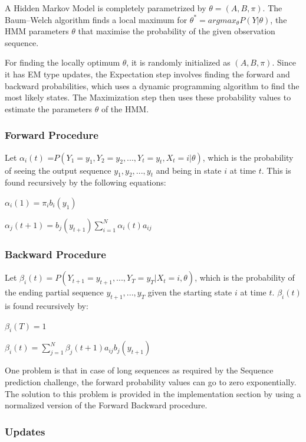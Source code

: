 \documentclass[letterpaper]{article}
\begin{document}
A Hidden Markov Model is completely parametrized by  $\theta = (A,B,\pi)$. The Baum–Welch algorithm finds a local maximum for $\theta^{*} = argmax_{\theta} P(Y|\theta)$, the HMM parameters $\theta$ that maximise the probability of the given observation sequence.
 
For finding the locally optimum $\theta$, it is randomly initialized as $(A, B, \pi)$. Since it has EM type updates, the Expectation step involves finding the forward and backward probabilities, which uses a dynamic programming algorithm to find the most likely states. The Maximization step then uses these probability values to estimate the parameters $\theta$ of the HMM.

\subsubsection{Forward Procedure}
Let $\alpha_{i}(t)$ =$P(Y_{1}=y_{1},Y_{2}=y_{2},...,Y_{t}=y_{t},X_{t}={i}|\theta)$, which is the probability of seeing the output sequence $y_{1},y_{2},...,y_{t}$ and being in state $i$ at time $t$. This is found recursively by the following equations:

\begin{center}
$\alpha_{i}(1)=\pi_{i} b_{i}(y_{1})$

$\alpha_{j}(t+1)=b_{j}(y_{t+1}) \sum_{i=1}^{N}\alpha_{i}(t) a_{ij}$
\end{center}

\subsubsection{Backward Procedure}

Let $\beta_{i}(t)=P(Y_{t+1}=y_{t+1},...,Y_{T}=y_{T}|X_{t}=i,\theta)$, which is the probability of the ending partial sequence $y_{t+1},...,y_{T}$ given the starting state $i$ at time $t$. $\beta_{i}(t)$ is found recursively by:
\begin{center}
$\beta_{i}(T)=1$


$\beta_{i}(t)=\sum_{j=1}^N \beta_{j}(t+1) a_{ij} b_{j}(y_{t+1})$
\end{center}
 
One problem is that in case of long sequences as required by the Sequence prediction challenge, the forward probability values can go to zero exponentially. The solution to this problem is provided in the implementation section by using a normalized version of the Forward Backward procedure.

\subsubsection{Updates}
\end{document}
